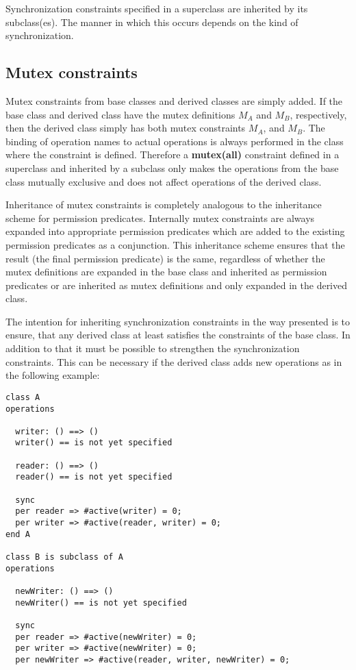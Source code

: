 \documentclass{overturerepchap}
\newcommand{\keyw}[1]{{\bf\ttfamily #1}}
\begin{document}
{Synchronization constraints specified in a superclass are inherited by
its subclass(es).
The manner in which this occurs depends on
the kind of synchronization.

\subsection{Mutex constraints}
Mutex constraints from base classes and derived classes are
simply added. If the base class and derived class have the mutex
definitions {$M_{A}$} and {$M_{B}$}, respectively, then the derived
class simply has both mutex constraints {$M_{A}$}, and
{$M_{B}$}. The binding of operation names to actual operations is
always performed in the class where the constraint is
defined. Therefore a \keyw{mutex(all)} constraint defined in a
superclass and inherited by a subclass only makes the operations from
the base class mutually exclusive and does not affect operations of
the derived class.

Inheritance of mutex constraints is completely analogous to the
inheritance scheme for  permission predicates. Internally mutex
constraints are always expanded into appropriate permission predicates
which are added to the existing permission predicates as a
conjunction. This inheritance scheme ensures that the result (the
final permission predicate) is the same, regardless of whether the mutex
definitions are expanded in the base class and inherited as permission
predicates or are inherited as mutex definitions and only expanded in
the derived class.

The intention for inheriting synchronization constraints in the way
presented is to ensure, that any derived class at least
satisfies the constraints of the base class.  In addition to that it
must be possible to strengthen the synchronization constraints. This
can be necessary if the derived class adds new operations as in the
following example:
\begin{lstlisting}
class A
operations

  writer: () ==> ()
  writer() == is not yet specified

  reader: () ==> ()
  reader() == is not yet specified

  sync
  per reader => #active(writer) = 0;
  per writer => #active(reader, writer) = 0;
end A

class B is subclass of A
operations

  newWriter: () ==> ()
  newWriter() == is not yet specified

  sync
  per reader => #active(newWriter) = 0;
  per writer => #active(newWriter) = 0;
  per newWriter => #active(reader, writer, newWriter) = 0;


\end{lstlisting}}
\end{document}
